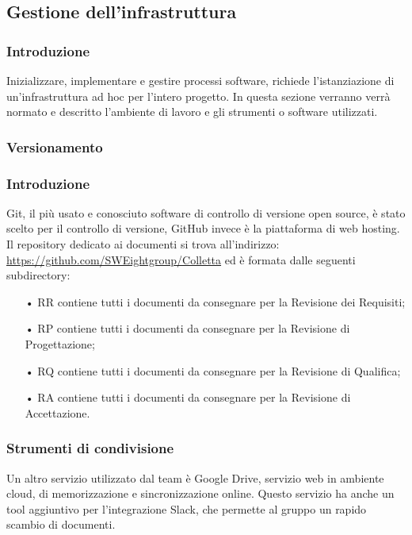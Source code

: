 \subsection{Gestione dell'infrastruttura}




\subsubsection{Introduzione}
Inizializzare, implementare e gestire processi software, richiede l’istanziazione di un’infrastruttura ad hoc per l'intero progetto. In questa sezione verranno verrà normato e descritto l’ambiente di lavoro e gli strumenti o software utilizzati.

\subsubsection{Versionamento}

\subsubsection{Introduzione}
Git, il più usato e conosciuto software di controllo di versione open source, è stato scelto per il controllo di versione, GitHub invece è la piattaforma di web hosting. 
\newline
Il repository dedicato ai documenti si trova all’indirizzo: \url{https://github.com/SWEightgroup/Colletta} ed è formata dalle seguenti subdirectory:
\begin{itemize}
\item[•] RR contiene tutti i documenti da consegnare per la Revisione dei Requisiti;
\item[•] RP contiene tutti i documenti da consegnare per la Revisione di Progettazione;
\item[•] RQ contiene tutti i documenti da consegnare per la Revisione di Qualifica;
\item[•] RA contiene tutti i documenti da consegnare per la Revisione di Accettazione.
\end{itemize}


\subsubsection{Strumenti di condivisione}
Un altro servizio utilizzato dal team è Google Drive, servizio web in ambiente cloud, di memorizzazione e sincronizzazione online. Questo servizio ha anche un tool aggiuntivo per l’integrazione Slack, che permette al gruppo un rapido scambio di documenti.

